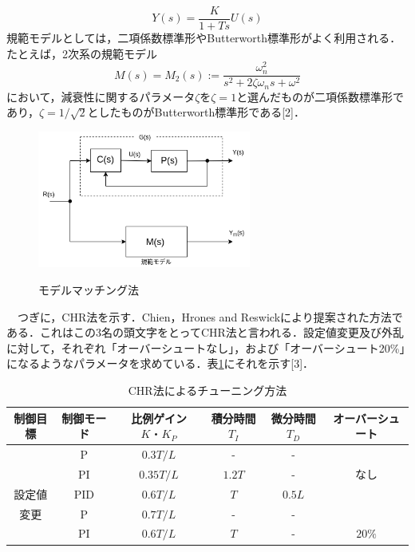 \documentclass[12pt]{jsarticle}
\begin{document}
\begin{description}
\begin{equation}
  \label{modelMatching-transform}
  Y(s) = \frac{K}{1+Ts}U(s)
\end{equation}
規範モデルとしては，二項係数標準形やButterworth標準形がよく利用される．たとえば，2次系の規範モデル
\begin{equation}
  \label{modelMatching-teachmodel}
  M(s) = M_2(s) := \frac{\omega_n^2}{s^2 + 2\zeta \omega_ns + \omega^2}
\end{equation}
において，減衰性に関するパラメータ$\zeta$を$\zeta=1$と選んだものが二項係数標準形であり，$\zeta=1/\sqrt{2}$としたものがButterworth標準形である[2]．\\

\begin{figure}[H]
  \begin{center}
    \label{modelMatching-Fig}
    \includegraphics[clip,width=7.0cm]{../img/modelMatching-Fig.png}
    \caption{モデルマッチング法}
  \end{center}
\end{figure}
　つぎに，CHR法を示す．Chien，Hrones and Reswickにより提案された方法である．これはこの3名の頭文字をとってCHR法と言われる．設定値変更及び外乱に対して，それぞれ「オーバーシュートなし」，および「オーバーシュート20\%」になるようなパラメータを求めている．表\ref{CHR-tuning}にそれを示す[3]．
\begin{table}[H]
  \begin{center}
    \label{CHR-tuning}
    \caption{CHR法によるチューニング方法}
    \begin{tabular}{|c|c|c|c|c|c|} \hline
      制御目標 & 制御モード & 比例ゲイン$K・K_P$ & 積分時間$T_I$ & 微分時間$T_D$ & オーバーシュート \\ \hline \hline
       & P & $0.3T/L$ & - & - & \\
       & PI & $0.35T/L$ & $1.2T$ & - & なし\\
       設定値 & PID & $0.6T/L$ & $T$ & $0.5L$ &\\ \cline{2-6}
       変更 & P & $0.7T/L$ & - & - & \\
       & PI & $0.6T/L$ & $T$ & - & $20\%$\\

\end{tabular}
\end{center}
\end{table}
\end{description}
\end{document}
